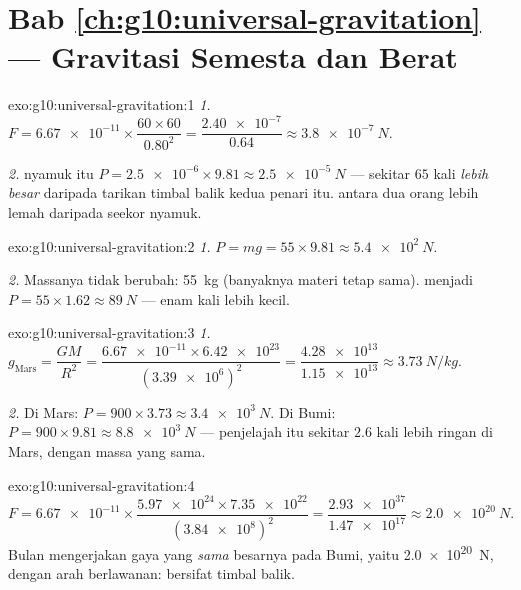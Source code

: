 \section*{Bab \ref{ch:g10:universal-gravitation} --- Gravitasi Semesta dan Berat}

\begin{solution}{exo:g10:universal-gravitation:1}
\emph{1.} $F = \num{6.67e-11} \times \dfrac{60 \times 60}{0.80^2}
= \dfrac{\num{2.40e-7}}{0.64} \approx \qty{3.8e-7}{N}$.

\emph{2.}  nyamuk itu
$P = \num{2.5e-6} \times 9.81 \approx \qty{2.5e-5}{N}$ --- sekitar $65$
kali \emph{lebih besar} daripada tarikan timbal balik kedua penari itu.
 antara dua orang lebih lemah daripada  seekor nyamuk.
\end{solution}

\begin{solution}{exo:g10:universal-gravitation:2}
\emph{1.} $P = mg = 55 \times 9.81 \approx \qty{5.4e2}{N}$.

\emph{2.} Massanya tidak berubah: \qty{55}{kg} (banyaknya materi tetap
sama).  menjadi
$P = 55 \times 1.62 \approx \qty{89}{N}$ --- enam kali lebih kecil.
\end{solution}

\begin{solution}{exo:g10:universal-gravitation:3}
\emph{1.} $g_{\text{Mars}} = \dfrac{G M}{R^2}
= \dfrac{\num{6.67e-11} \times \num{6.42e23}}{(\num{3.39e6})^2}
= \dfrac{\num{4.28e13}}{\num{1.15e13}} \approx \qty{3.73}{N/kg}$.

\emph{2.} Di Mars: $P = 900 \times 3.73 \approx \qty{3.4e3}{N}$. Di
Bumi: $P = 900 \times 9.81 \approx \qty{8.8e3}{N}$ --- penjelajah itu
sekitar $2.6$ kali lebih ringan di Mars, dengan massa yang sama.
\end{solution}

\begin{solution}{exo:g10:universal-gravitation:4}
\[
F = \num{6.67e-11} \times
\frac{\num{5.97e24} \times \num{7.35e22}}{(\num{3.84e8})^2}
= \frac{\num{2.93e37}}{\num{1.47e17}}
\approx \qty{2.0e20}{N}.
\]
Bulan mengerjakan gaya yang \emph{sama} besarnya pada Bumi, yaitu
\qty{2.0e20}{N}, dengan arah berlawanan:  bersifat timbal
balik.
\end{solution}

